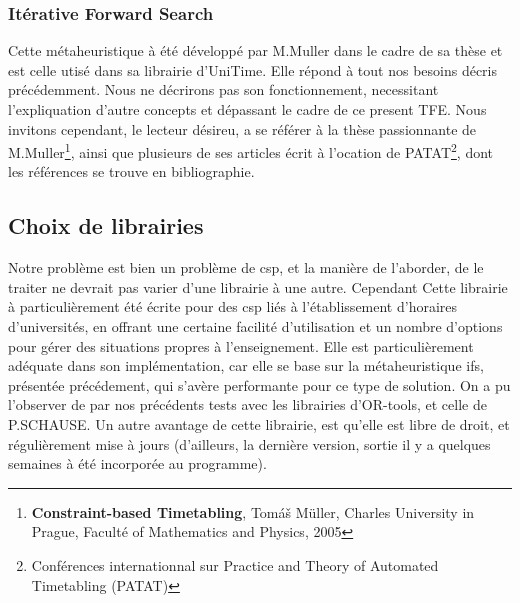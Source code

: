 \subsubsection{Itérative Forward Search}
Cette métaheuristique à été développé par M.Muller dans le cadre de sa thèse et est celle utisé dans sa librairie d'UniTime. 
Elle répond à tout nos besoins décris précédemment. Nous ne décrirons pas son fonctionnement, 
necessitant l'expliquation d'autre concepts et dépassant le cadre de ce present TFE. Nous invitons cependant, le lecteur désireu, a se référer à la thèse passionnante de M.Muller\footnote{\textbf{Constraint-based Timetabling}, Tomáš Müller, Charles University in Prague, Faculté of Mathematics and Physics, 2005}, ainsi que plusieurs de ses articles écrit à l'ocation de PATAT\footnote{Conférences internationnal sur Practice and Theory of Automated Timetabling (PATAT)}, dont les références se trouve en bibliographie.


\subsection{Choix de librairies}
Notre problème est bien un problème de csp, et la manière de l'aborder, de le traiter ne devrait pas varier d'une librairie à une autre.  Cependant Cette librairie à particulièrement été écrite pour des csp liés à l'établissement d'horaires d'universités, en offrant une certaine facilité d'utilisation et un nombre d'options pour gérer des situations propres à l'enseignement.
Elle est particulièrement adéquate dans son implémentation, car elle se base sur la métaheuristique ifs, présentée précédement, qui s'avère performante pour ce type de solution.  On a pu l'observer de par nos précédents tests avec les librairies d'OR-tools, et celle de P.SCHAUSE.
\newline
\indent
Un autre avantage de cette librairie, est qu'elle est libre de droit, et régulièrement mise à jours (d'ailleurs, la dernière version, sortie il y a quelques semaines à été incorporée au programme).


